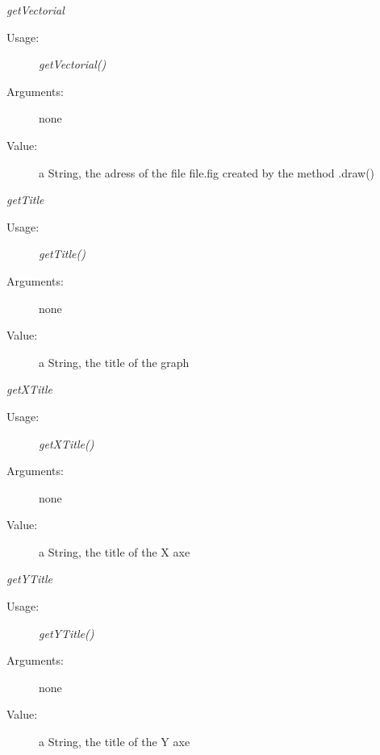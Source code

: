 \begin{description}
\begin{description}
  \item \textit{getVectorial}
    \begin{description}
    \item[Usage:] \textit{getVectorial()}
    \item[Arguments:] none
    \item[Value:] a String, the adress of the file file.fig created by the method .draw()
    \end{description}
    \bigskip


  \item \textit{getTitle}
    \begin{description}
    \item[Usage:] \textit{getTitle()}
    \item[Arguments:] none
    \item[Value:] a String, the title of the graph
    \end{description}
    \bigskip

  \item \textit{getXTitle}
    \begin{description}
    \item[Usage:] \textit{getXTitle()}
    \item[Arguments:] none
    \item[Value:] a String, the title of the X axe
    \end{description}
    \bigskip

  \item \textit{getYTitle}
    \begin{description}
    \item[Usage:] \textit{getYTitle()}
    \item[Arguments:] none
    \item[Value:] a String, the title of the Y axe
    \end{description}
    \bigskip


\end{description}
\end{description}
